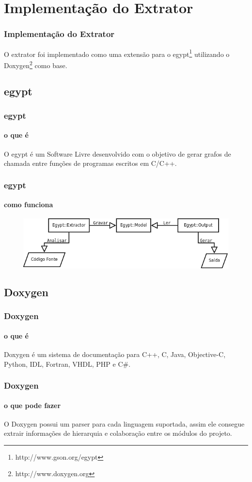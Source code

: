 \documentclass{beamer}
\begin{document}
\section{Implementação do Extrator}

\begin{frame}
\frametitle{Implementação do Extrator}
 O extrator foi implementado como uma extensão para o
 egypt\footnote{http://www.gson.org/egypt} utilizando o
 Doxygen\footnote{http://www.doxygen.org} como base.
\end{frame}

\subsection{egypt}

\begin{frame}
\frametitle{egypt}
\framesubtitle{o que é}
 O egypt é um Software Livre desenvolvido com o objetivo de gerar grafos de
 chamada entre funções de programas escritos em C/C++.
\end{frame}

\begin{frame}
\frametitle{egypt}
\framesubtitle{como funciona}
 \begin{figure}[h]
 \center
 \includegraphics[scale=0.3]{imagens/egypt-fluxogram}
 \label{fig:egypt-fluxogram}
 \end{figure}
\end{frame}

\subsection{Doxygen}

\begin{frame}
\frametitle{Doxygen}
\framesubtitle{o que é}
 Doxygen é um sistema de documentação para C++, C, Java, Objective-C, Python,
 IDL, Fortran, VHDL, PHP e C\#.
\end{frame}

\begin{frame}
\frametitle{Doxygen}
\framesubtitle{o que pode fazer}
 O Doxygen possui um parser para cada linguagem suportada, assim ele consegue extrair
 informações de hierarquia e colaboração entre os módulos do projeto.
\end{frame}
\end{document}
